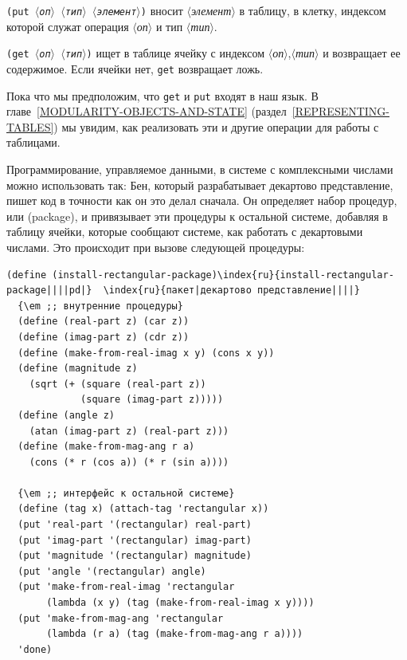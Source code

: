 \begin{plainlist}


\item
{\tt (put \textit{$\langle$оп$\rangle$} \textit{$\langle$тип$\rangle$} \textit{$\langle$элемент$\rangle$})} 
вносит
\textit{$\langle$элемент$\rangle$} в таблицу, в клетку, индексом которой служат
операция \textit{$\langle$оп$\rangle$} и тип \textit{$\langle$тип$\rangle$}.

\item
{\tt (get \textit{$\langle$оп$\rangle$} \textit{$\langle$тип$\rangle$})} 
ищет в таблице ячейку с
индексом \textit{$\langle$оп$\rangle$},\textit{$\langle$тип$\rangle$} и возвращает ее
содержимое.  Если ячейки нет, {\tt get} возвращает ложь.
\end{plainlist}
Пока что мы предположим, что 
{\tt get} и {\tt put} входят в наш язык. В 
главе~\ref{MODULARITY-OBJECTS-AND-STATE} 
(раздел~\ref{REPRESENTING-TABLES}) мы увидим, как реализовать эти
и другие операции для работы с таблицами.

Программирование, управляемое данными, в системе с
комплексными числами можно использовать так:  Бен, который разрабатывает
декартово представление, пишет код в точности как он это делал
сначала.  Он определяет набор процедур, или 
 (package),
и привязывает эти процедуры к остальной системе, добавляя в таблицу
ячейки, которые сообщают системе, как работать с декартовыми числами.
Это происходит при вызове следующей процедуры:

\begin{Verbatim}[fontsize=\small]
(define (install-rectangular-package)\index{ru}{install-rectangular-package||||pd|}  \index{ru}{пакет|декартово представление||||} 
  {\em ;; внутренние процедуры}
  (define (real-part z) (car z))
  (define (imag-part z) (cdr z))
  (define (make-from-real-imag x y) (cons x y))
  (define (magnitude z)
    (sqrt (+ (square (real-part z))
             (square (imag-part z)))))
  (define (angle z)
    (atan (imag-part z) (real-part z)))
  (define (make-from-mag-ang r a) 
    (cons (* r (cos a)) (* r (sin a))))

  {\em ;; интерфейс к остальной системе}
  (define (tag x) (attach-tag 'rectangular x))
  (put 'real-part '(rectangular) real-part)
  (put 'imag-part '(rectangular) imag-part)
  (put 'magnitude '(rectangular) magnitude)
  (put 'angle '(rectangular) angle)
  (put 'make-from-real-imag 'rectangular
       (lambda (x y) (tag (make-from-real-imag x y))))
  (put 'make-from-mag-ang 'rectangular
       (lambda (r a) (tag (make-from-mag-ang r a))))
  'done)
\end{Verbatim}

